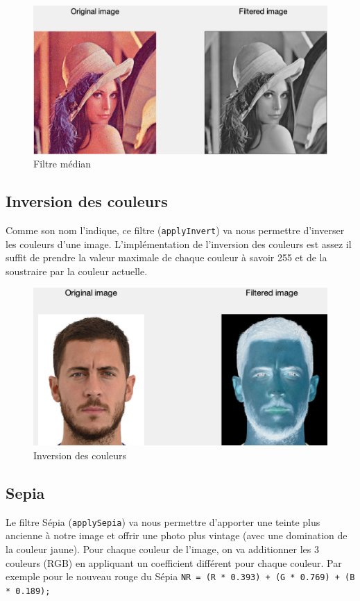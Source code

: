 \documentclass[12pt,a4paper]{article}
\begin{document}
\begin{figure}[H]
\centering
\includegraphics[scale=0.5]{img/median}
\caption{Filtre médian}
\end{figure}

\subsection{Inversion des couleurs}
Comme son nom l'indique, ce filtre  (\texttt{applyInvert}) va nous permettre d'inverser les couleurs d'une image. L'implémentation de l'inversion des couleurs est assez il suffit de prendre la valeur maximale de chaque couleur à savoir 255 et de la soustraire par la couleur actuelle. 

\begin{figure}[H]
\centering
\includegraphics[scale=0.5]{img/invert}
\caption{Inversion des couleurs}
\end{figure}

\subsection{Sepia}
Le filtre Sépia (\texttt{applySepia}) va nous permettre d'apporter une teinte plus ancienne à notre image et offrir une photo plus vintage (avec une domination de la couleur jaune). Pour chaque couleur de l'image, on va additionner les 3 couleurs (RGB) en appliquant un coefficient différent pour chaque couleur. 
\newline
Par exemple pour le nouveau rouge du Sépia \texttt{NR = (R * 0.393) + (G * 0.769) + (B * 0.189);}
\end{document}

